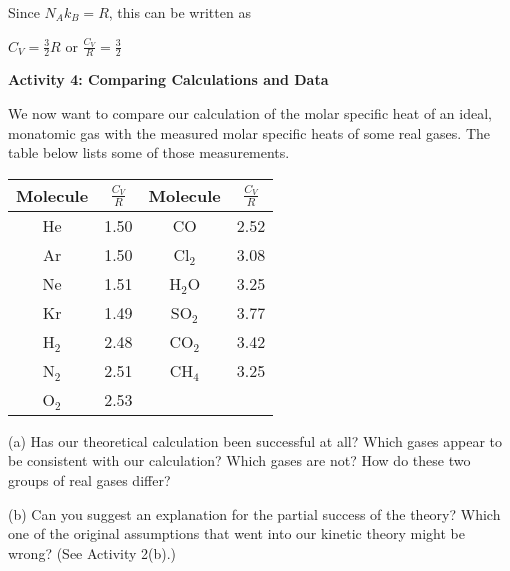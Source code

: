 Since \( N_{A}k_{B}=R \), this can be written as

{\centering \( C_{V}=\frac{3}{2}R \) or \( \frac{C_{V}}{R}=\frac{3}{2} \)\par}
\vspace{0.3in}

\textbf{Activity 4: Comparing Calculations and Data}

We now want to compare our calculation of the molar specific heat
of an ideal, monatomic gas with the measured molar specific heats
of some real gases. The table below lists some of those measurements.

\vspace{0.3cm}
{\centering \begin{tabular}{|c|c|c|c|}
\hline 
Molecule&
\( \frac{C_{V}}{R} \)&
Molecule&
\( \frac{C_{V}}{R} \)\\
\hline
\hline 
He&
1.50&
CO&
2.52\\
\hline 
Ar&
1.50&
Cl\( _{2} \)&
3.08\\
\hline 
Ne&
1.51&
H\( _{2} \)O&
3.25\\
\hline 
Kr&
1.49&
SO\( _{2} \)&
3.77\\
\hline 
H\( _{2} \)&
2.48&
CO\( _{2} \)&
3.42\\
\hline 
N\( _{2} \)&
2.51&
CH\( _{4} \)&
3.25\\
\hline 
O\( _{2} \)&
2.53&
&
\\
\hline
\end{tabular}\par}
\vspace{0.3cm}

(a) Has our theoretical calculation been successful at all? Which
gases appear to be consistent with our calculation? Which gases are
not? How do these two groups of real gases differ?
\vspace{1in}

(b) Can you suggest an explanation for the partial success of the
theory? Which one of the original assumptions that went into our kinetic
theory might be wrong? (See Activity 2(b).)\vspace{2in}

